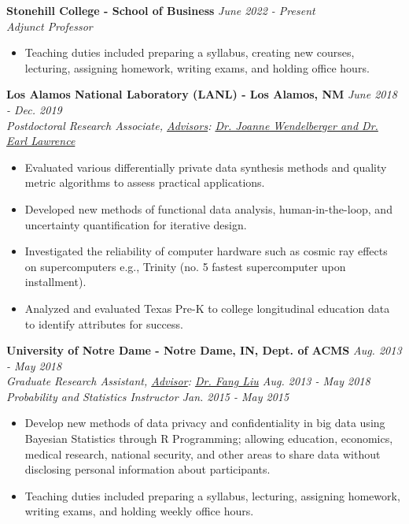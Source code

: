 \workspace
    \textbf{Stonehill College - School of Business} \hfill \textit{June 2022 - Present}\\
    \textit{Adjunct Professor}
    \begin{itemize}
        \item Teaching duties included preparing a syllabus, creating new courses, lecturing, assigning homework, writing exams, and holding office hours.
    \end{itemize}

\workspace
    \textbf{Los Alamos National Laboratory (LANL) - Los Alamos, NM} \hfill \textit{June 2018 - Dec. 2019}\\
    \textit{Postdoctoral Research Associate, \underline{Advisors}: \href{http://www.lanl.gov/expertise/profiles/view/joanne-wendelberger}{Dr. Joanne Wendelberger and Dr. Earl Lawrence}}
    \begin{itemize}
        \item Evaluated various differentially private data synthesis methods and quality metric algorithms to assess practical applications.
        \item Developed new methods of functional data analysis, human-in-the-loop, and uncertainty quantification for iterative design.
        \item Investigated the reliability of computer hardware such as cosmic ray effects on supercomputers e.g., Trinity (no. 5 fastest supercomputer upon installment).
        \item Analyzed and evaluated Texas Pre-K to college longitudinal education data to identify attributes for success.
    \end{itemize}

\workspace
    \textbf{University of Notre Dame - Notre Dame, IN, Dept. of ACMS} \hfill \textit{Aug. 2013 - May 2018}\\
    \textit{Graduate Research Assistant, \underline{Advisor}: \href{http://acms.nd.edu/people/faculty/fang-liu/}{Dr. Fang Liu} \hfill Aug. 2013 - May 2018}\\
    \textit{Probability and Statistics Instructor \hfill Jan. 2015 - May 2015}
    \begin{itemize}
        \item Develop new methods of data privacy and confidentiality in big data using Bayesian Statistics through R Programming; allowing education, economics, medical research, national security, and other areas to share data without disclosing personal information about participants.
        \item Teaching duties included preparing a syllabus, lecturing, assigning homework, writing exams, and holding weekly office hours.
    \end{itemize}

